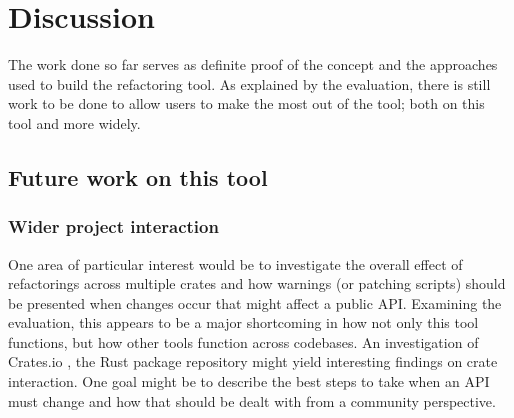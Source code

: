 \section{Discussion}\label{C:future}

The work done so far serves as definite proof of the concept and the approaches used to build the refactoring tool. As explained by the evaluation, there is still work to be done to allow users to make the most out of the tool; both on this tool and more widely.



\subsection{Future work on this tool}
\subsubsection{Wider project interaction}

One area of particular interest would be to investigate the overall effect of refactorings across multiple crates and how warnings (or patching scripts) should be presented when changes occur that might affect a public API. Examining the evaluation, this appears to be a major shortcoming in how not only this tool functions, but how other tools function across codebases. An investigation of Crates.io \cite{cratesio15}, the Rust package repository might yield interesting findings on crate interaction. One goal might be to describe the best steps to take when an API must change and how that should be dealt with from a community perspective. 

